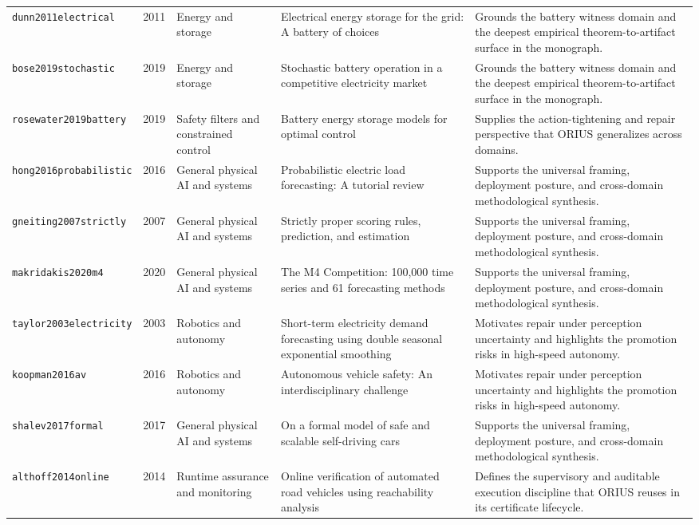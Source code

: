 \begin{longtable}{p{}p{}p{}p{}p{}}
\texttt{dunn2011electrical} & 2011 & Energy and storage & Electrical energy storage for the grid: A battery of choices & Grounds the battery witness domain and the deepest empirical theorem-to-artifact surface in the monograph.\\
\texttt{bose2019stochastic} & 2019 & Energy and storage & Stochastic battery operation in a competitive electricity market & Grounds the battery witness domain and the deepest empirical theorem-to-artifact surface in the monograph.\\
\texttt{rosewater2019battery} & 2019 & Safety filters and constrained control & Battery energy storage models for optimal control & Supplies the action-tightening and repair perspective that ORIUS generalizes across domains.\\
\texttt{hong2016probabilistic} & 2016 & General physical AI and systems & Probabilistic electric load forecasting: A tutorial review & Supports the universal framing, deployment posture, and cross-domain methodological synthesis.\\
\texttt{gneiting2007strictly} & 2007 & General physical AI and systems & Strictly proper scoring rules, prediction, and estimation & Supports the universal framing, deployment posture, and cross-domain methodological synthesis.\\
\texttt{makridakis2020m4} & 2020 & General physical AI and systems & The M4 Competition: 100,000 time series and 61 forecasting methods & Supports the universal framing, deployment posture, and cross-domain methodological synthesis.\\
\texttt{taylor2003electricity} & 2003 & Robotics and autonomy & Short-term electricity demand forecasting using double seasonal exponential smoothing & Motivates repair under perception uncertainty and highlights the promotion risks in high-speed autonomy.\\
\texttt{koopman2016av} & 2016 & Robotics and autonomy & Autonomous vehicle safety: An interdisciplinary challenge & Motivates repair under perception uncertainty and highlights the promotion risks in high-speed autonomy.\\
\texttt{shalev2017formal} & 2017 & General physical AI and systems & On a formal model of safe and scalable self-driving cars & Supports the universal framing, deployment posture, and cross-domain methodological synthesis.\\
\texttt{althoff2014online} & 2014 & Runtime assurance and monitoring & Online verification of automated road vehicles using reachability analysis & Defines the supervisory and auditable execution discipline that ORIUS reuses in its certificate lifecycle.\\

\end{longtable}
